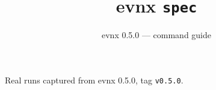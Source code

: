 \documentclass[aspectratio=169,10pt]{beamer}
\title{evnx \texttt{spec}}
\subtitle{evnx 0.5.0 — command guide}
\date{}
\begin{document}
\begin{frame}[plain]\titlepage
  \begin{center}\footnotesize
  \textcolor{evnxMuted}{Real runs captured from evnx 0.5.0, tag \texttt{v0.5.0}.}
  \end{center}
\end{frame}

\end{document}
